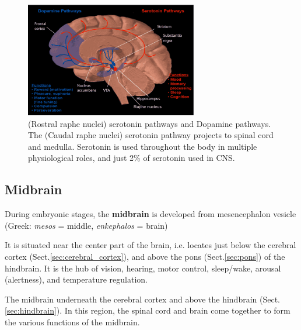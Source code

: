 \begin{figure}[hbt]
  \centerline{\includegraphics[height=5cm,
    angle=0]{./images/serotonin-pathways.eps}}
\caption{(Rostral raphe nuclei) serotonin pathways and Dopamine pathways. The
(Caudal raphe nuclei) serotonin pathway projects to spinal cord and medulla.
Serotonin is used throughout the body in multiple physiological roles, and just 2\% 
of serotonin used in CNS.}
\label{fig:serotonin-pathways}
\label{fig:dopamine-pathways}
\end{figure}


\subsection{Midbrain}
\label{sec:midbrain}

During embryonic stages, the {\bf midbrain} is developed from mesencephalon
vesicle (Greek: {\it mesos} = middle, {\it enkephalos} = brain) 

It is situated near the center part of the brain, i.e. locates just below the
cerebral cortex (Sect.\ref{sec:cerebral_cortex}), and above the pons
(Sect.\ref{sec:pons}) of the hindbrain.
It is the hub of vision, hearing, motor control, sleep/wake, arousal
(alertness), and temperature regulation.

The midbrain underneath the cerebral cortex and above the hindbrain
(Sect.\ref{sec:hindbrain}). In this region, the spinal cord and brain come
together to form the various functions of the midbrain.


